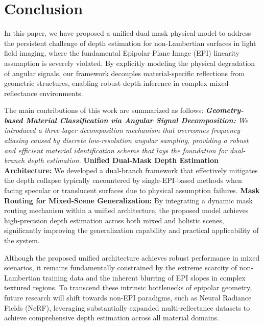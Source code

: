 \section{Conclusion}


In this paper, we have proposed a unified dual-mask physical model to address the persistent challenge of depth estimation for non-Lambertian surfaces in light field imaging, where the fundamental Epipolar Plane Image (EPI) linearity assumption is severely violated. By explicitly modeling the physical degradation of angular signals, our framework decouples material-specific reflections from geometric structures, enabling robust depth inference in complex mixed-reflectance environments. 

The main contributions of this work are summarized as follows:
\textit{ \textbf{Geometry-based Material Classification via Angular Signal Decomposition:} We introduced a three-layer decomposition mechanism that overcomes frequency aliasing caused by discrete low-resolution angular sampling, providing a robust and efficient material identification scheme that lays the foundation for dual-branch depth estimation.
} \textbf{Unified Dual-Mask Depth Estimation Architecture:} We developed a dual-branch framework that effectively mitigates the depth collapse typically encountered by single-EPI-based methods when facing specular or translucent surfaces due to physical assumption failures.
\textbf{Mask Routing for Mixed-Scene Generalization:} By integrating a dynamic mask routing mechanism within a unified architecture, the proposed model achieves high-precision depth estimation across both mixed and holistic scenes, significantly improving the generalization capability and practical applicability of the system.

Although the proposed unified architecture achieves robust performance in mixed scenarios, it remains fundamentally constrained by the extreme scarcity of non-Lambertian training data and the inherent blurring of EPI slopes in complex textured regions. To transcend these intrinsic bottlenecks of epipolar geometry, future research will shift towards non-EPI paradigms, such as Neural Radiance Fields (NeRF), leveraging substantially expanded multi-reflectance datasets to achieve comprehensive depth estimation across all material domains.


